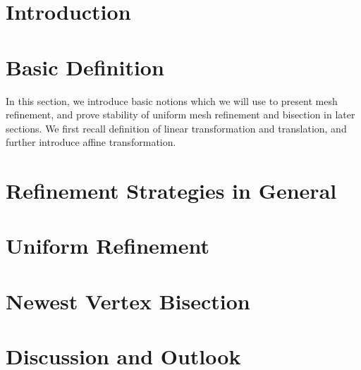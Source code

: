 \documentclass[english]{article}
\begin{document}
  

  \section{Introduction}
  

  \section{Basic Definition}
    In this section, we introduce basic notions which we will use to present mesh refinement, and prove stability of uniform mesh refinement and bisection in later sections.
    We first recall definition of linear transformation and translation, and further introduce affine transformation.

    
    
    
    


  \section{Refinement Strategies in General}
    

  \section{Uniform Refinement}
    

  \section{Newest Vertex Bisection}
    

  \section{Discussion and Outlook}
    

  \newpage
  
  
    
\end{document}

